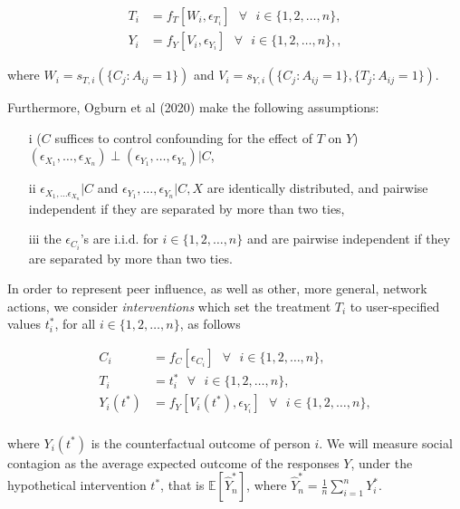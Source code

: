 \documentclass{article}
\begin{document}
\begin{align*}
 T_i &= f_T[W_i, \epsilon_{T_i}] \mbox{ } \forall \mbox{ } i \in \{1, 2, \hdots, n\},\\
 Y_i &= f_Y[V_i, \epsilon_{Y_i}] \mbox{ } \forall \mbox{ } i \in \{1, 2, \hdots, n\},,
\end{align*}

\noindent where $W_i = s_{T, i}(\{C_j: A_{ij} =1 \})$ and $V_i = s_{Y, i}(\{ C_j: A_{ij} =1\}, \{T_j: A_{ij} =1\})$. 

Furthermore, Ogburn et al (2020) \cite{Ogburn2020} make the following assumptions:

\begin{itemize}
\item[i] ($C$ suffices to control confounding for the effect of $T$ on $Y$) $(\epsilon_{X_1}, \hdots, \epsilon_{X_n}) \perp (\epsilon_{Y_1}, \hdots, \epsilon_{Y_n}) | C$, 
\item[ii ] $\epsilon_{X_1, \hdots \epsilon_{X_n}} | C$ and $\epsilon_{Y_1}, \hdots, \epsilon_{Y_n} | C, X$ are identically distributed, and pairwise independent if they are separated by more than two ties, 
\item[iii ] the $\epsilon_{C_i}$'s are i.i.d. for $i \in \{1,2, \hdots, n\}$ and are pairwise independent if they are separated by more than two ties. 

\end{itemize}

In order to represent peer influence, as well as other, more general, network actions, we consider \textit{interventions} which set the treatment $T_i$ to user-specified values $t_i^*$, for all $i \in \{1, 2, \hdots, n \}$, as follows

\begin{align*}
C_i &= f_C[\epsilon_{C_i}] \mbox{ } \forall \mbox{ } i \in \{1, 2, \hdots, n\}, \\
T_i  &= t_i^* \mbox{ } \forall \mbox{ } i \in \{1, 2, \hdots, n\}, \\
Y_i(t^*) &= f_Y[V_i(t^*), \epsilon_{Y_i}]  \mbox{ } \forall \mbox{ } i \in \{1, 2, \hdots, n\}, \\
\end{align*}


\noindent where $Y_i(t^*)$ is the counterfactual outcome of person $i$. We will measure social contagion as the average expected outcome of the responses $Y$, under the hypothetical intervention $t^*$, that is $\mathbb{E}[\hat{Y}_n^*]$, where $\hat{Y}_n^* = \frac{1}{n} \sum_{i=1}^n Y_i^*$. 
\end{document}
